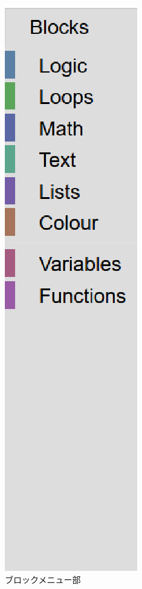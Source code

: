 \documentclass{eniepaper}
\begin{document}
\begin{figure}[h]
\begin{center}
\includegraphics[scale=0.3]{img/blockmenu.eps}
\caption{ブロックメニュー部}%
\label{fig:blockmenu}
\end{center}%
\end{figure}%
\end{document}
